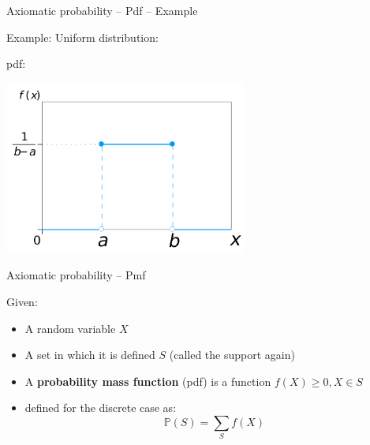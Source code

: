 \documentclass{beamer}
\begin{document}
\begin{frame}
{\centerline{Axiomatic probability -- Pdf -- Example }}
Example: Uniform distribution:

pdf:
\begin{center}
\includegraphics[width=8cm]{A2022.FondamentiStatistica/Uniform_Distribution_PDF_SVG_svg.png}
\end{center} 

\end{frame}



\begin{frame}
{\centerline{Axiomatic probability -- Pmf}}
Given:
\begin{itemize}
\item A random variable $X$
\item A set in which it is defined $S$ (called the support again)
\item A \textbf{probability mass function} (pdf) is a function $f(X) \geq 0, X \in S$
\item defined for the discrete case as:
$$\mathbb{P}(S) = \sum_{S} f(X) $$
\end{itemize}

\end{frame}

\end{document}
